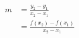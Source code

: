 \begin{equation}
\begin{split}
    m &= \frac{y_2 - y_1}{x_2 - x_1} \\
      &= \frac{f(x_2) - f(x_1)}{x_2 - x_1}
\end{split}
\end{equation}